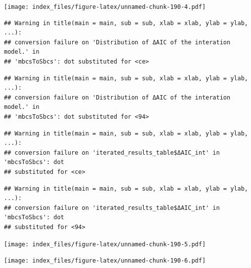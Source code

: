 \documentclass[
]{article}
\newenvironment{Shaded}{\begin{snugshade}}{\end{snugshade}}
\newcommand{\AttributeTok}[1]{\textcolor[rgb]{0.77,0.63,0.00}{#1}}
\newcommand{\FunctionTok}[1]{\textcolor[rgb]{0.00,0.00,0.00}{#1}}
\newcommand{\NormalTok}[1]{#1}
\newcommand{\SpecialCharTok}[1]{\textcolor[rgb]{0.00,0.00,0.00}{#1}}
\newcommand{\StringTok}[1]{\textcolor[rgb]{0.31,0.60,0.02}{#1}}
\begin{document}
\texttt{[image: index\_files/figure-latex/unnamed-chunk-190-4.pdf]}

\begin{Shaded}
\end{Shaded}

\begin{verbatim}
## Warning in title(main = main, sub = sub, xlab = xlab, ylab = ylab, ...):
## conversion failure on 'Distribution of ΔAIC of the interation model.' in
## 'mbcsToSbcs': dot substituted for <ce>
\end{verbatim}

\begin{verbatim}
## Warning in title(main = main, sub = sub, xlab = xlab, ylab = ylab, ...):
## conversion failure on 'Distribution of ΔAIC of the interation model.' in
## 'mbcsToSbcs': dot substituted for <94>
\end{verbatim}

\begin{verbatim}
## Warning in title(main = main, sub = sub, xlab = xlab, ylab = ylab, ...):
## conversion failure on 'iterated_results_table$ΔAIC_int' in 'mbcsToSbcs': dot
## substituted for <ce>
\end{verbatim}

\begin{verbatim}
## Warning in title(main = main, sub = sub, xlab = xlab, ylab = ylab, ...):
## conversion failure on 'iterated_results_table$ΔAIC_int' in 'mbcsToSbcs': dot
## substituted for <94>
\end{verbatim}

\texttt{[image: index\_files/figure-latex/unnamed-chunk-190-5.pdf]}

\begin{Shaded}
\end{Shaded}

\texttt{[image: index\_files/figure-latex/unnamed-chunk-190-6.pdf]}
\end{document}
